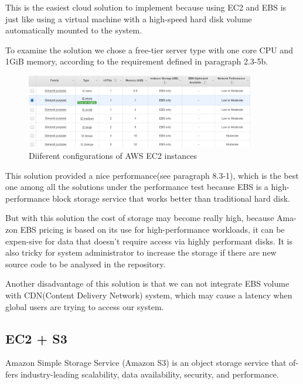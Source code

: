 \documentclass[runningheads]{llncs}
\begin{document}
This is the easiest cloud solution to implement because using EC2 and EBS is just like using a virtual machine with a high-speed hard disk volume automatically mounted to the system.

To examine the solution we chose a free-tier server type with one core CPU and 1GiB memory, according to the requirement defined in paragraph 2.3-5b.

\begin{figure}[H]
	\centering
	\includegraphics[width=10cm]{pic/ec2-free-tier.png}
	\caption{Diiferent configurations of AWS EC2 instances}
	\label{Diiferent configurations of AWS EC2 instances}
\end{figure}

This solution provided a nice performance(see paragraph 8.3-1), which is the best one among all the solutions under the performance test because EBS is a high-performance block storage service that works better than traditional hard disk.

But with this solution the cost of storage may become really high, because Ama-zon EBS pricing is based on its use for high-performance workloads, it can be expen-sive for data that doesn’t require access via highly performant disks.\cite{ebs-efs-amazons3} It is also tricky for system administrator to increase the storage if there are new source code to be analysed in the repository.

Another disadvantage of this solution is that we can not integrate EBS volume with CDN(Content Delivery Network)\cite{Content_delivery_network} system, which may cause a latency when global users are trying to access our system.

\subsection{EC2 + S3}

Amazon Simple Storage Service (Amazon S3) is an object storage service that of-fers industry-leading scalability, data availability, security, and performance.\cite{amazons3}
\end{document}
